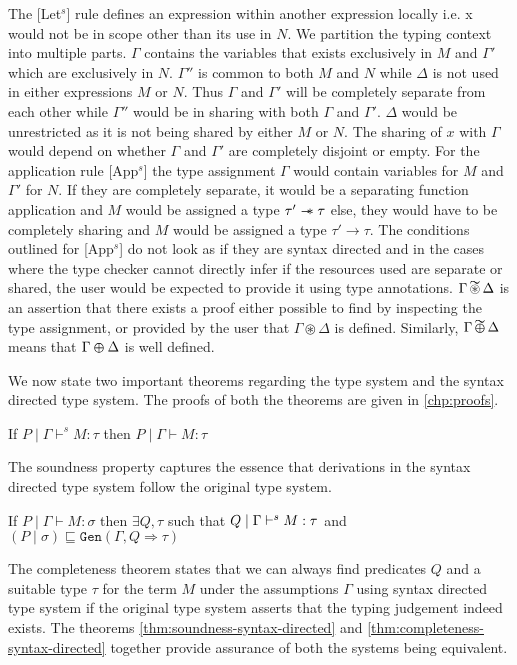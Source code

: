 The [Let$^s$] rule defines an expression within another expression locally i.e. x would
not be in scope other than its use in $N$. We partition the typing context into multiple parts.
$\Gamma$ contains the variables that exists exclusively in $M$ and $\Gamma'$ which
are exclusively in $N$. $\Gamma''$ is common to both $M$ and $N$ while $\Delta$ is not used in either expressions $M$ or $N$.
Thus $\Gamma$ and $\Gamma'$ will be completely separate from each other while $\Gamma''$ would be in sharing with both $\Gamma$ and $\Gamma'$.
$\Delta$ would be unrestricted as it is not being shared by either $M$ or $N$. The sharing of $x$ with $\Gamma$ would depend on
whether $\Gamma$ and $\Gamma'$ are completely disjoint or empty. For the application rule [App$^s$] the type assignment $\Gamma$ would contain
variables for $M$ and $\Gamma'$ for $N$. If they are completely separate, it would be a separating function application and $M$ would be
assigned a type $\tau' \mathrel{-\mkern-6mu*} \tau$ else, they would have to be completely sharing and $M$ would be assigned a type $\tau' \rightarrow \tau$.
The conditions outlined for [App$^s$] do not look as if they are syntax directed and in the cases where the type checker cannot directly infer if the
resources used are separate or shared, the user would be expected to provide it using type annotations. $\Gamma \tightoverset{\thicksim}{\circledast} \Delta$
is an assertion that there exists a proof either possible to find by inspecting the type assignment, or provided by the user
that $\Gamma \circledast \Delta$ is defined. Similarly, $\Gamma \tightoverset{\thicksim}{\varoplus} \Delta$ means that $\Gamma \varoplus \Delta$ is well
defined.

We now state two important theorems regarding the type system and the syntax directed type system. The proofs of both the
theorems are given in \cref{chp:proofs}.

\begin{theorem}\label{thm:soundness-syntax-directed}
  If $P \mid \Gamma \vdash^s M:\tau$ then $P \mid \Gamma \vdash M : \tau$
\end{theorem}
The soundness property captures the essence that derivations in the syntax directed type system follow the original type system.

\begin{theorem}\label{thm:completeness-syntax-directed}
  If $P \mid \Gamma \vdash M:\sigma$ then
  $\exists Q, \tau$ such that $Q \mid \Gamma \vdash^s M:\tau$
  and $(P \mid \sigma) \sqsubseteq \texttt{Gen}(\Gamma, Q \Rightarrow \tau)$
\end{theorem}
The completeness theorem states that we can always find predicates $Q$ and a suitable type $\tau$ for the term $M$ under the assumptions
$\Gamma$ using syntax directed type system if the original type system asserts that the typing judgement indeed exists.
The theorems \cref{thm:soundness-syntax-directed} and \cref{thm:completeness-syntax-directed} together provide assurance of both the systems
being equivalent.

